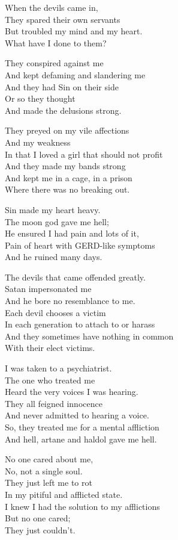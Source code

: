 \documentclass[
]{book}
\begin{document}
When the devils came in,\\
They spared their own servants\\
But troubled my mind and my heart.\\
What have I done to them?

They conspired against me\\
And kept defaming and slandering me\\
And they had Sin on their side\\
Or so they thought\\
And made the delusions strong.

They preyed on my vile affections\\
And my weakness\\
In that I loved a girl that should not profit\\
And they made my bands strong\\
And kept me in a cage, in a prison\\
Where there was no breaking out.

Sin made my heart heavy.\\
The moon god gave me hell;\\
He ensured I had pain and lots of it,\\
Pain of heart with GERD-like symptoms\\
And he ruined many days.

The devils that came offended greatly.\\
Satan impersonated me\\
And he bore no resemblance to me.\\
Each devil chooses a victim\\
In each generation to attach to or harass\\
And they sometimes have nothing in common\\
With their elect victims.

I was taken to a psychiatrist.\\
The one who treated me\\
Heard the very voices I was hearing.\\
They all feigned innocence\\
And never admitted to hearing a voice.\\
So, they treated me for a mental affliction\\
And hell, artane and haldol gave me hell.

No one cared about me,\\
No, not a single soul.\\
They just left me to rot\\
In my pitiful and afflicted state.\\
I knew I had the solution to my afflictions\\
But no one cared;\\
They just couldn't.
\end{document}
